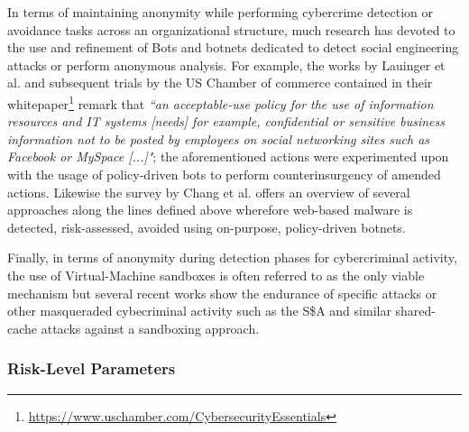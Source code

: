 In terms of maintaining anonymity while performing cybercrime detection or avoidance tasks across an organizational structure, much research has devoted to the use and refinement of Bots and botnets dedicated to detect social engineering attacks or perform anonymous analysis. For example, the works by Lauinger et al. \cite{LauingerPBK10} and subsequent trials by the US Chamber of commerce contained in their whitepaper\footnote{\url{https://www.uschamber.com/CybersecurityEssentials}} remark that \emph{``an acceptable-use policy for the use of information resources and IT systems [needs] for example, confidential or sensitive business information not to be posted by employees on social networking sites such as Facebook or MySpace [...]"}; the aforementioned actions were experimented upon with the usage of policy-driven bots to perform counterinsurgency of amended actions. Likewise the survey by Chang et al. \cite{ChangVWL13} offers an overview of several approaches along the lines defined above wherefore web-based malware is detected, risk-assessed, avoided using on-purpose, policy-driven botnets. 

Finally, in terms of anonymity during detection phases for cybercriminal activity, the use of Virtual-Machine sandboxes is often referred to as the only viable mechanism \cite{ChangVWL13} but several recent works show the endurance of specific attacks or other masqueraded cybecriminal activity such as the S\$A and similar shared-cache attacks \cite{ApececheaES15} against a sandboxing approach.

\subsubsection{Risk-Level Parameters}

